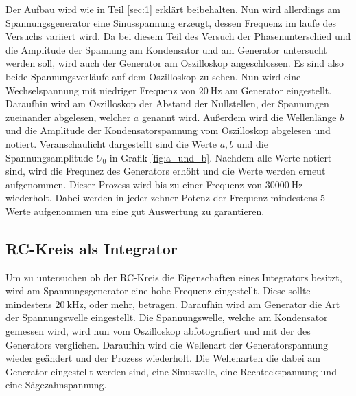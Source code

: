 Der Aufbau wird wie in Teil \ref{sec:1} erklärt beibehalten.
Nun wird allerdings am Spannungsgenerator eine Sinusspannung erzeugt, dessen Frequenz im laufe des Versuchs variiert wird.
Da bei diesem Teil des Versuch der Phasenunterschied und die Amplitude der Spannung am Kondensator und am Generator untersucht werden soll, wird auch der Generator am Oszilloskop angeschlossen.
Es sind also beide Spannungsverläufe auf dem Oszilloskop zu sehen.
Nun wird eine Wechselspannung mit niedriger Frequenz von $\SI{20}{\hertz}$ am Generator eingestellt.
Daraufhin wird am Oszilloskop der Abstand der Nullstellen, der Spannungen zueinander abgelesen, welcher $a$ genannt wird.
Außerdem wird die Wellenlänge $b$ und die Amplitude der Kondensatorspannung vom Oszilloskop abgelesen und notiert.
Veranschaulicht dargestellt sind die Werte $a, b$ und die Spannungsamplitude $U_0$ in Grafik \ref{fig:a_und_b}.
Nachdem alle Werte notiert sind, wird die Frequnez des Generators erhöht und die Werte werden erneut aufgenommen.
Dieser Prozess wird bis zu einer Frequenz von $\SI{30000}{\hertz}$ wiederholt.
Dabei werden in jeder zehner Potenz der Frequenz mindestens 5 Werte aufgenommen um eine gut Auswertung zu garantieren.


\subsection{RC-Kreis als Integrator}
Um zu untersuchen ob der RC-Kreis die Eigenschaften eines Integrators besitzt, wird am Spannungsgenerator eine hohe Frequenz eingestellt.
Diese sollte mindestens $\SI{20}{\kilo\hertz}$, oder mehr, betragen.
Daraufhin wird am Generator die Art der Spannungswelle eingestellt.
Die Spannungswelle, welche am Kondensator gemessen wird, wird nun vom Oszilloskop abfotografiert und mit der des Generators verglichen.
Daraufhin wird die Wellenart der Generatorspannung wieder geändert und der Prozess wiederholt.
Die Wellenarten die dabei am Generator eingestellt werden sind, eine Sinuswelle, eine Rechteckspannung und eine Sägezahnspannung.